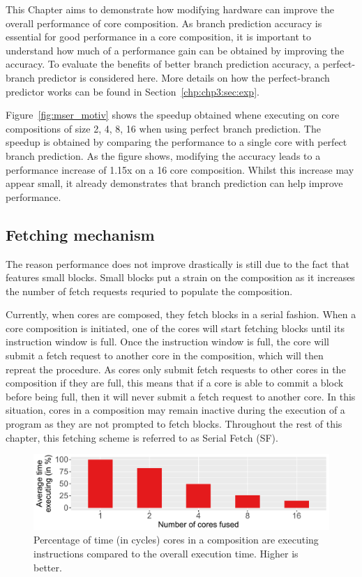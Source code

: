 This Chapter aims to demonstrate how modifying hardware can improve the overall performance of core composition.
As branch prediction accuracy is essential for good performance in a core composition, it is important to understand how much of a performance gain can be obtained by improving the accuracy.
To evaluate the benefits of better branch prediction accuracy, a perfect-branch predictor is considered here.
More details on how the perfect-branch predictor works can be found in Section~\ref{chp:chp3:sec:exp}.


Figure~\ref{fig:mser_motiv} shows the speedup obtained whene executing  on core compositions of size 2, 4, 8, 16 when using perfect branch prediction.
The speedup is obtained by comparing the performance to a single core with perfect branch prediction.
As the figure shows, modifying the accuracy leads to a performance increase of 1.15x on a 16 core composition.
Whilst this increase may appear small, it already demonstrates that branch prediction can help improve performance.

\subsection{Fetching mechanism}

The reason performance does not improve drastically is still due to the fact that  features small blocks.
Small blocks put a strain on the composition as it increases the number of fetch requests requried to populate the composition.

Currently, when cores are composed, they fetch blocks in a serial fashion.
When a core composition is initiated, one of the cores will start fetching blocks until its instruction window is full.
Once the instruction window is full, the core will submit a fetch request to another core in the composition, which will then repreat the procedure.
As cores only submit fetch requests to other cores in the composition if they are full, this means that if a core is able to commit a block before being full, then it will never submit a fetch request to another core.
In this situation, cores in a composition may remain inactive during the execution of a program as they are not prompted to fetch blocks.
Throughout the rest of this chapter, this fetching scheme is referred to as Serial Fetch (SF).%

\begin{figure}[t]
    \centering
    \includegraphics[width=1\textwidth]{chapter3/graphics/mser_active_16.pdf}
    \caption{Percentage of time (in cycles) cores in a composition are executing instructions compared to the overall execution time. Higher is better.}
    \label{fig:motivation_perc}
	\vspace{-1em}
\end{figure}

